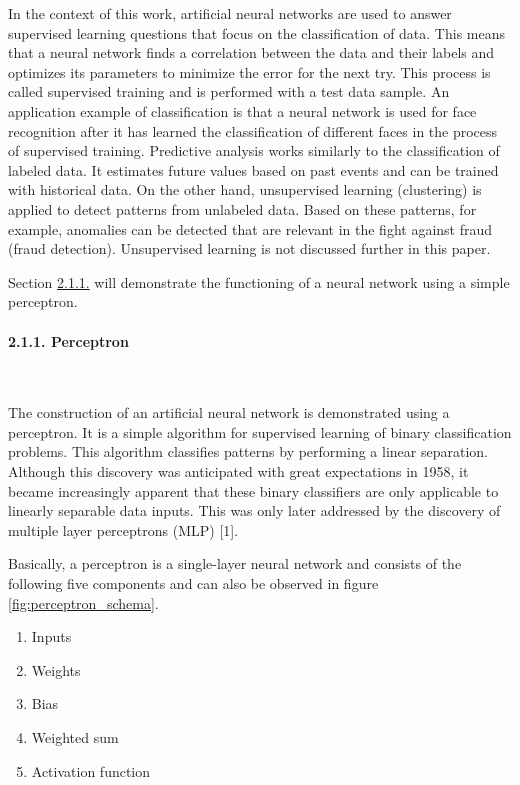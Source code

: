 \documentclass[
]{article}
\begin{document}
In the context of this work, artificial neural networks are used to
answer supervised learning questions that focus on the classification of
data. This means that a neural network finds a correlation between the
data and their labels and optimizes its parameters to minimize the error
for the next try. This process is called supervised training and is
performed with a test data sample. An application example of
classification is that a neural network is used for face recognition
after it has learned the classification of different faces in the
process of supervised training. Predictive analysis works similarly to
the classification of labeled data. It estimates future values based on
past events and can be trained with historical data. On the other hand,
unsupervised learning (clustering) is applied to detect patterns from
unlabeled data. Based on these patterns, for example, anomalies can be
detected that are relevant in the fight against fraud (fraud detection).
Unsupervised learning is not discussed further in this paper.

Section \protect\hyperlink{perceptron}{2.1.1.} will demonstrate the
functioning of a neural network using a simple perceptron.

\hypertarget{perceptron}{%
\paragraph{2.1.1. Perceptron}\label{perceptron}}

~

The construction of an artificial neural network is demonstrated using a
perceptron. It is a simple algorithm for supervised learning of binary
classification problems. This algorithm classifies patterns by
performing a linear separation. Although this discovery was anticipated
with great expectations in 1958, it became increasingly apparent that
these binary classifiers are only applicable to linearly separable data
inputs. This was only later addressed by the discovery of multiple layer
perceptrons (MLP) {[}1{]}.

Basically, a perceptron is a single-layer neural network and consists of
the following five components and can also be observed in figure
\ref{fig:perceptron_schema}.

\begin{enumerate}
\def\labelenumi{\arabic{enumi}.}
\item
  Inputs
\item
  Weights
\item
  Bias
\item
  Weighted sum
\item
  Activation function
\end{enumerate}
\end{document}
